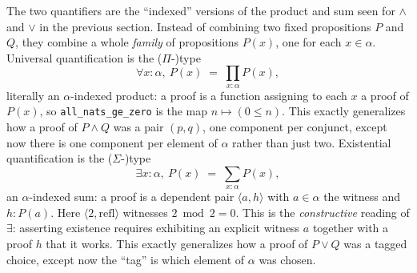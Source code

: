 \begin{mathreading}

The two quantifiers are the ``indexed'' versions of the product and sum seen for \(\wedge\) and \(\vee\) in the previous section. Instead of combining two fixed propositions \(P\) and \(Q\), they combine a whole \emph{family} of propositions \(P(x)\), one for each \(x \in \alpha\). Universal quantification is the (\(\Pi\)-)type \[
\forall x{:}\alpha,\ P(x) \;=\; \prod_{x : \alpha} P(x),
\] literally an \(\alpha\)-indexed product: a proof is a function assigning to each \(x\) a proof of \(P(x)\), so \texttt{all\_\allowbreak{}nats\_\allowbreak{}ge\_\allowbreak{}zero} is the map \(n \mapsto (0
\le n)\). This exactly generalizes how a proof of \(P \wedge Q\) was a pair \((p, q)\), one component per conjunct, except now there is one component per element of \(\alpha\) rather than just two. Existential quantification is the (\(\Sigma\)-)type \[
\exists x{:}\alpha,\ P(x) \;=\; \sum_{x : \alpha} P(x),
\] an \(\alpha\)-indexed sum: a proof is a dependent pair \(\langle a, h\rangle\) with \(a \in \alpha\) the witness and \(h : P(a)\). Here \(\langle 2,
\mathrm{refl}\rangle\) witnesses \(2 \bmod 2 = 0\). This is the \emph{constructive} reading of \(\exists\): asserting existence requires exhibiting an explicit witness \(a\) together with a proof \(h\) that it works. This exactly generalizes how a proof of \(P \vee Q\) was a tagged choice, except now the ``tag'' is which element of \(\alpha\) was chosen.

\end{mathreading}
